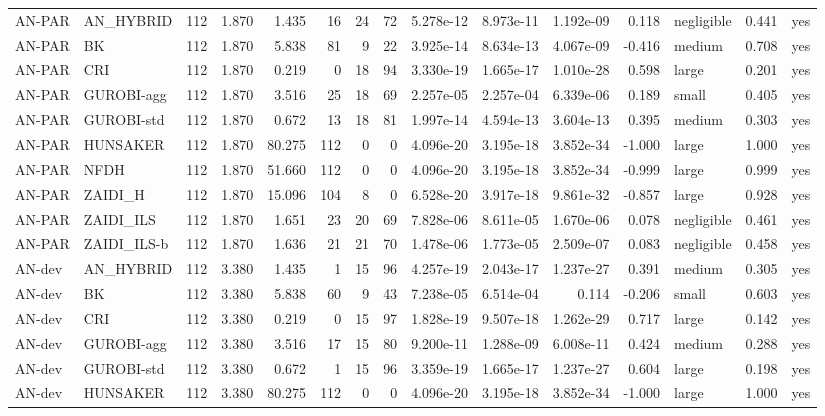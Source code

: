 \begin{table}[htbp]
\begin{tabular}{llrrrrrrrrrrlrr}
AN-PAR & AN\_HYBRID & 112 & 1.870 & 1.435 & 16 & 24 & 72 & 5.278e-12 & 8.973e-11 & 1.192e-09 & 0.118 & negligible & 0.441 & yes \\
AN-PAR & BK & 112 & 1.870 & 5.838 & 81 & 9 & 22 & 3.925e-14 & 8.634e-13 & 4.067e-09 & -0.416 & medium & 0.708 & yes \\
AN-PAR & CRI & 112 & 1.870 & 0.219 & 0 & 18 & 94 & 3.330e-19 & 1.665e-17 & 1.010e-28 & 0.598 & large & 0.201 & yes \\
AN-PAR & GUROBI-agg & 112 & 1.870 & 3.516 & 25 & 18 & 69 & 2.257e-05 & 2.257e-04 & 6.339e-06 & 0.189 & small & 0.405 & yes \\
AN-PAR & GUROBI-std & 112 & 1.870 & 0.672 & 13 & 18 & 81 & 1.997e-14 & 4.594e-13 & 3.604e-13 & 0.395 & medium & 0.303 & yes \\
AN-PAR & HUNSAKER & 112 & 1.870 & 80.275 & 112 & 0 & 0 & 4.096e-20 & 3.195e-18 & 3.852e-34 & -1.000 & large & 1.000 & yes \\
AN-PAR & NFDH & 112 & 1.870 & 51.660 & 112 & 0 & 0 & 4.096e-20 & 3.195e-18 & 3.852e-34 & -0.999 & large & 0.999 & yes \\
AN-PAR & ZAIDI\_H & 112 & 1.870 & 15.096 & 104 & 8 & 0 & 6.528e-20 & 3.917e-18 & 9.861e-32 & -0.857 & large & 0.928 & yes \\
AN-PAR & ZAIDI\_ILS & 112 & 1.870 & 1.651 & 23 & 20 & 69 & 7.828e-06 & 8.611e-05 & 1.670e-06 & 0.078 & negligible & 0.461 & yes \\
AN-PAR & ZAIDI\_ILS-b & 112 & 1.870 & 1.636 & 21 & 21 & 70 & 1.478e-06 & 1.773e-05 & 2.509e-07 & 0.083 & negligible & 0.458 & yes \\
AN-dev & AN\_HYBRID & 112 & 3.380 & 1.435 & 1 & 15 & 96 & 4.257e-19 & 2.043e-17 & 1.237e-27 & 0.391 & medium & 0.305 & yes \\
AN-dev & BK & 112 & 3.380 & 5.838 & 60 & 9 & 43 & 7.238e-05 & 6.514e-04 & 0.114 & -0.206 & small & 0.603 & yes \\
AN-dev & CRI & 112 & 3.380 & 0.219 & 0 & 15 & 97 & 1.828e-19 & 9.507e-18 & 1.262e-29 & 0.717 & large & 0.142 & yes \\
AN-dev & GUROBI-agg & 112 & 3.380 & 3.516 & 17 & 15 & 80 & 9.200e-11 & 1.288e-09 & 6.008e-11 & 0.424 & medium & 0.288 & yes \\
AN-dev & GUROBI-std & 112 & 3.380 & 0.672 & 1 & 15 & 96 & 3.359e-19 & 1.665e-17 & 1.237e-27 & 0.604 & large & 0.198 & yes \\
AN-dev & HUNSAKER & 112 & 3.380 & 80.275 & 112 & 0 & 0 & 4.096e-20 & 3.195e-18 & 3.852e-34 & -1.000 & large & 1.000 & yes \\

\end{tabular}
\end{table}
